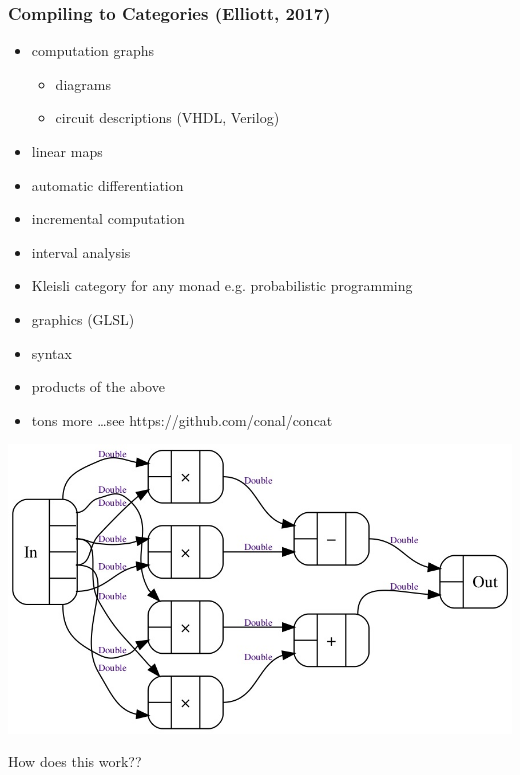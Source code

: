 \documentclass[
  xcolor={usenames,dvipsnames,svgnames},
  ]{beamer}
\begin{document}
\begin{frame}
  \frametitle{Compiling to Categories (Elliott, 2017)}
  \begin{itemize}
    \item computation graphs
    \begin{itemize}
    \item diagrams
    \item circuit descriptions (VHDL, Verilog)
  \end{itemize}
    \item linear maps
    \item automatic differentiation
    \item incremental computation
    \item interval analysis
    \item Kleisli category for any monad e.g. probabilistic programming
    \item graphics (GLSL)
    \item syntax
    \item products of the above
    \item tons more \ldots see https://github.com/conal/concat
  \end{itemize}
\end{frame}

{\usebackgroundtemplate%
{%
\parbox[c][\paperheight][c]{\paperwidth}{\centering\includegraphics[width=\paperwidth]{graphics/complex-mul.jpg}}
}

\begin{frame}
\end{frame}

}

\begin{frame}
  \begin{center}
      \Large \color{black}
      How does this work??
    \end{center}
\end{frame}
\end{document}

